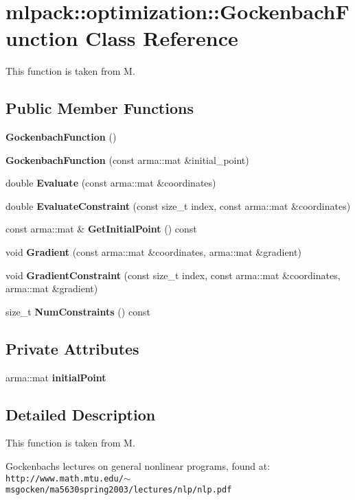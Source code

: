 \section{mlpack\+:\+:optimization\+:\+:Gockenbach\+Function Class Reference}
\label{classmlpack_1_1optimization_1_1GockenbachFunction}


This function is taken from M.  


\subsection*{Public Member Functions}
\begin{DoxyCompactItemize}
\item 
{\bf Gockenbach\+Function} ()
\item 
{\bf Gockenbach\+Function} (const arma\+::mat \&initial\+\_\+point)
\item 
double {\bf Evaluate} (const arma\+::mat \&coordinates)
\item 
double {\bf Evaluate\+Constraint} (const size\+\_\+t index, const arma\+::mat \&coordinates)
\item 
const arma\+::mat \& {\bf Get\+Initial\+Point} () const 
\item 
void {\bf Gradient} (const arma\+::mat \&coordinates, arma\+::mat \&gradient)
\item 
void {\bf Gradient\+Constraint} (const size\+\_\+t index, const arma\+::mat \&coordinates, arma\+::mat \&gradient)
\item 
size\+\_\+t {\bf Num\+Constraints} () const 
\end{DoxyCompactItemize}
\subsection*{Private Attributes}
\begin{DoxyCompactItemize}
\item 
arma\+::mat {\bf initial\+Point}
\end{DoxyCompactItemize}


\subsection{Detailed Description}
This function is taken from M. 

Gockenbach\textquotesingle{}s lectures on general nonlinear programs, found at\+: {\tt http\+://www.\+math.\+mtu.\+edu/$\sim$msgocken/ma5630spring2003/lectures/nlp/nlp.\+pdf}


